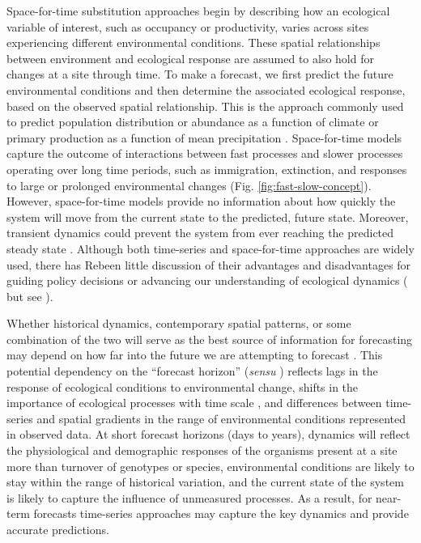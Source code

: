 \documentclass[11pt]{article}
\begin{document}
Space-for-time substitution approaches begin by describing how an ecological variable of interest, such as occupancy or productivity,  varies across sites experiencing different environmental conditions. These spatial relationships between environment and ecological response are assumed to also hold for changes at a site through time. To make a forecast, we first predict the future environmental conditions and then determine the associated ecological response, based on the observed spatial relationship.  This is the approach commonly used to predict population distribution or abundance as a function of climate \citep{elith_species_2009} or primary production as a function of mean precipitation \citep{Sala1988}. Space-for-time models capture the outcome of interactions between fast processes and slower processes operating over long time periods, such as immigration, extinction, and responses to large or prolonged environmental changes (Fig. \ref{fig:fast-slow-concept}). However, space-for-time models provide no information about how quickly the system will move from the current state to the predicted, future state. Moreover, transient dynamics could prevent the system from ever reaching the predicted steady state \citep{Urban2012}. Although both time-series and space-for-time approaches are widely used, there has Rebeen little discussion of their advantages and disadvantages for guiding policy decisions or advancing our understanding of ecological dynamics (\citealt{harris_forecasting_2018} but see \citealt{Renwick2018}). 

Whether historical dynamics, contemporary spatial patterns, or some combination of the two will serve as the best source of 
information for forecasting may depend on how far into the future we are attempting to forecast \citep{harris_forecasting_2018}. 
This potential dependency on the ``forecast horizon'' (\textit{sensu} \citealt{Hyndman2018})
reflects lags in the response of ecological conditions to environmental change, shifts in the importance of ecological processes with
time scale \citep{levin_1992,rosenzweig_1995}, and differences between time-series and spatial gradients in the range of 
environmental conditions represented in observed data.
At short forecast horizons (days to years), dynamics will reflect the physiological and demographic responses of 
the organisms present at a site more than turnover of genotypes or species, 
environmental conditions are likely to stay within the range of historical variation, 
and the current state of the system is likely to capture the influence of unmeasured processes. As a result, 
for near-term forecasts time-series approaches may capture the key dynamics and provide accurate predictions.
\end{document}
